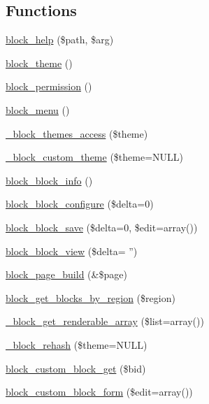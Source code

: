 \subsection*{Functions}
\begin{DoxyCompactItemize}
\item 
\hyperlink{block_8module_a7e5b76030048a2d65c8e619456b72081}{block\_\-help} (\$path, \$arg)
\item 
\hyperlink{block_8module_a1bd427b94fa44c9a985d768adc2d190e}{block\_\-theme} ()
\item 
\hyperlink{block_8module_a41b263bbd3c2a8be0790bf1a11c3e04d}{block\_\-permission} ()
\item 
\hyperlink{block_8module_a4306efb2047cb30ce81f3c0907618dfd}{block\_\-menu} ()
\item 
\hyperlink{block_8module_a22dd1b7d12d940c3ffde84a330745658}{\_\-block\_\-themes\_\-access} (\$theme)
\item 
\hyperlink{block_8module_a8386bef2df0ce448d4c5a9d0f5f948e5}{\_\-block\_\-custom\_\-theme} (\$theme=NULL)
\item 
\hyperlink{block_8module_a95565cfe7f2b05d193193401ea736a13}{block\_\-block\_\-info} ()
\item 
\hyperlink{block_8module_a35380eeb6fcddcb5959bc2dc1f3d87ea}{block\_\-block\_\-configure} (\$delta=0)
\item 
\hyperlink{block_8module_af0ede6201f8b5159ef74a1fa1df283c2}{block\_\-block\_\-save} (\$delta=0, \$edit=array())
\item 
\hyperlink{block_8module_ae67bf125a478508e2b301bb0b25e181e}{block\_\-block\_\-view} (\$delta= '')
\item 
\hyperlink{block_8module_a554cfaeffe083326bc06d1c59fba4f3d}{block\_\-page\_\-build} (\&\$page)
\item 
\hyperlink{block_8module_a24738e61e8de38a23d6a2b333eb84817}{block\_\-get\_\-blocks\_\-by\_\-region} (\$region)
\item 
\hyperlink{block_8module_adaff538964e0c5a2350dc3c133ae5c02}{\_\-block\_\-get\_\-renderable\_\-array} (\$list=array())
\item 
\hyperlink{block_8module_aa42865f9782787a854c27877cb850dbc}{\_\-block\_\-rehash} (\$theme=NULL)
\item 
\hyperlink{block_8module_a2303e104471351f6d8916d4cfc71b18d}{block\_\-custom\_\-block\_\-get} (\$bid)
\item 
\hyperlink{group__forms_ga94f8fff63b59438120a7269f00dad174}{block\_\-custom\_\-block\_\-form} (\$edit=array())
\item 

\end{DoxyCompactItemize}

